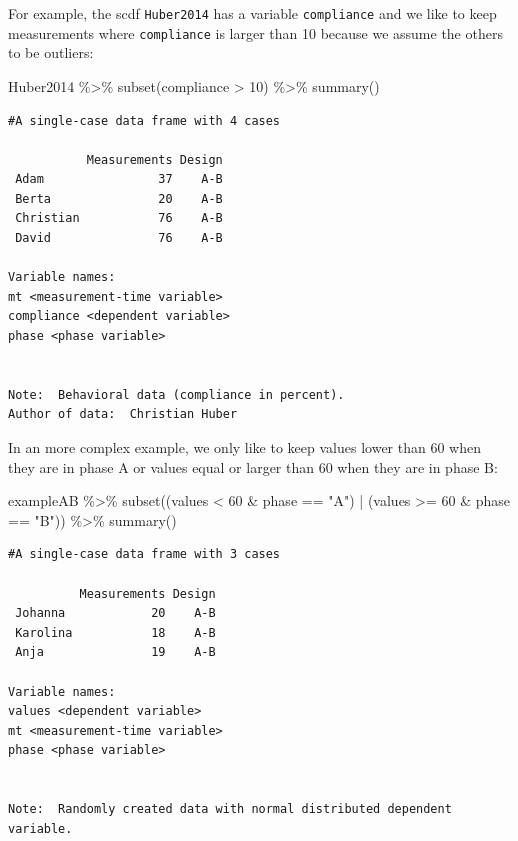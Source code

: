 \documentclass[
  letterpaper,
  DIV=11,
  numbers=noendperiod]{scrreprt}
\newenvironment{Shaded}{\begin{snugshade}}{\end{snugshade}}
\newcommand{\DecValTok}[1]{\textcolor[rgb]{0.68,0.00,0.00}{#1}}
\newcommand{\FunctionTok}[1]{\textcolor[rgb]{0.28,0.35,0.67}{#1}}
\newcommand{\NormalTok}[1]{\textcolor[rgb]{0.00,0.23,0.31}{#1}}
\newcommand{\SpecialCharTok}[1]{\textcolor[rgb]{0.37,0.37,0.37}{#1}}
\newcommand{\StringTok}[1]{\textcolor[rgb]{0.13,0.47,0.30}{#1}}
\begin{document}
For example, the scdf \texttt{Huber2014} has a variable
\texttt{compliance} and we like to keep measurements where
\texttt{compliance} is larger than 10 because we assume the others to be
outliers:

\begin{Shaded}
\begin{Highlighting}[]
\NormalTok{Huber2014 }\SpecialCharTok{\%\textgreater{}\%}
  \FunctionTok{subset}\NormalTok{(compliance }\SpecialCharTok{\textgreater{}} \DecValTok{10}\NormalTok{) }\SpecialCharTok{\%\textgreater{}\%}
  \FunctionTok{summary}\NormalTok{()}
\end{Highlighting}
\end{Shaded}

\begin{verbatim}
#A single-case data frame with 4 cases

           Measurements Design
 Adam                37    A-B
 Berta               20    A-B
 Christian           76    A-B
 David               76    A-B

Variable names:
mt <measurement-time variable>
compliance <dependent variable>
phase <phase variable>


Note:  Behavioral data (compliance in percent).
Author of data:  Christian Huber 
\end{verbatim}

In an more complex example, we only like to keep values lower than 60
when they are in phase A or values equal or larger than 60 when they are
in phase B:

\begin{Shaded}
\begin{Highlighting}[]
\NormalTok{exampleAB }\SpecialCharTok{\%\textgreater{}\%}
  \FunctionTok{subset}\NormalTok{((values }\SpecialCharTok{\textless{}} \DecValTok{60} \SpecialCharTok{\&}\NormalTok{ phase }\SpecialCharTok{==} \StringTok{"A"}\NormalTok{) }\SpecialCharTok{|}\NormalTok{ (values }\SpecialCharTok{\textgreater{}=} \DecValTok{60} \SpecialCharTok{\&}\NormalTok{ phase }\SpecialCharTok{==} \StringTok{"B"}\NormalTok{)) }\SpecialCharTok{\%\textgreater{}\%}
  \FunctionTok{summary}\NormalTok{()}
\end{Highlighting}
\end{Shaded}

\begin{verbatim}
#A single-case data frame with 3 cases

          Measurements Design
 Johanna            20    A-B
 Karolina           18    A-B
 Anja               19    A-B

Variable names:
values <dependent variable>
mt <measurement-time variable>
phase <phase variable>


Note:  Randomly created data with normal distributed dependent variable.
\end{verbatim}
\end{document}
